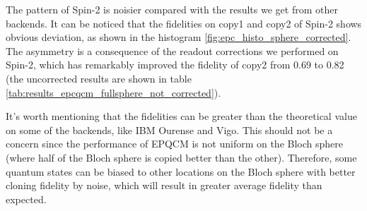 The pattern of Spin-2 is noisier compared with the results we get from other backends. It can be noticed that the fidelities on copy1 and copy2 of Spin-2 shows obvious deviation, as shown in the histogram \ref{fig:epc_histo_sphere_corrected}. The asymmetry is a consequence of the readout corrections we performed on Spin-2, which has remarkably improved the fidelity of copy2 from 0.69 to 0.82 (the uncorrected results are shown in table \ref{tab:results_epcqcm_fullsphere_not_corrected}).

It's worth mentioning that the fidelities can be greater than the theoretical value on some of the backends, like IBM Ourense and Vigo. This should not be a concern since the performance of EPQCM is not uniform on the Bloch sphere (where half of the Bloch sphere is copied better than the other). Therefore, some quantum states can be biased to other locations on the Bloch sphere with better cloning fidelity by noise, which will result in greater average fidelity than expected.

